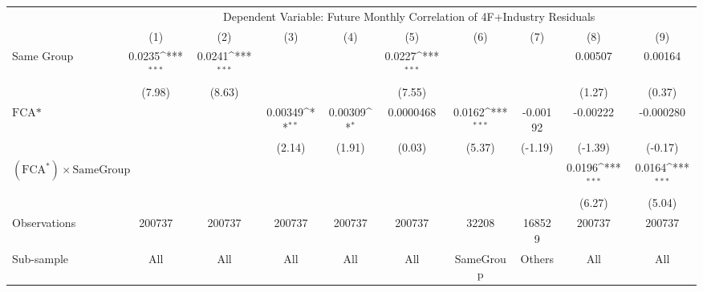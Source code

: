 {
\def\sym#1{\ifmmode^{#1}\else\(^{#1}\)\fi}
\begin{tabular}{l*{9}{c}}
\hline\hline
                &\multicolumn{9}{c}{Dependent Variable: Future Monthly Correlation of 4F+Industry Residuals}                                                                               \\\cmidrule(lr){2-10}
                &\multicolumn{1}{c}{(1)}         &\multicolumn{1}{c}{(2)}         &\multicolumn{1}{c}{(3)}         &\multicolumn{1}{c}{(4)}         &\multicolumn{1}{c}{(5)}         &\multicolumn{1}{c}{(6)}         &\multicolumn{1}{c}{(7)}         &\multicolumn{1}{c}{(8)}         &\multicolumn{1}{c}{(9)}         \\
\hline
Same Group      &   0.0235\sym{***}&   0.0241\sym{***}&                  &                  &   0.0227\sym{***}&                  &                  &  0.00507         &  0.00164         \\
                &   (7.98)         &   (8.63)         &                  &                  &   (7.55)         &                  &                  &   (1.27)         &   (0.37)         \\
[1em]
$ \text{FCA*} $ &                  &                  &  0.00349\sym{**} &  0.00309\sym{*}  &0.0000468         &   0.0162\sym{***}& -0.00192         & -0.00222         &-0.000280         \\
                &                  &                  &   (2.14)         &   (1.91)         &   (0.03)         &   (5.37)         &  (-1.19)         &  (-1.39)         &  (-0.17)         \\
[1em]
 $ (\text{FCA}^*) \times {\text{SameGroup} }  $ &                  &                  &                  &                  &                  &                  &                  &   0.0196\sym{***}&   0.0164\sym{***}\\
                &                  &                  &                  &                  &                  &                  &                  &   (6.27)         &   (5.04)         \\
\hline
Observations    &   200737         &   200737         &   200737         &   200737         &   200737         &    32208         &   168529         &   200737         &   200737         \\
Sub-sample      &      All         &      All         &      All         &      All         &      All         &SameGroup         &   Others         &      All         &      All         \\

\end{tabular}}
